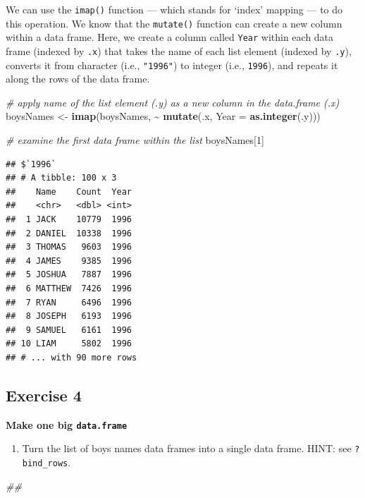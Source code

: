 \documentclass[
]{book}
\newenvironment{Shaded}{\begin{snugshade}}{\end{snugshade}}
\newcommand{\CommentTok}[1]{\textcolor[rgb]{0.56,0.35,0.01}{\textit{#1}}}
\newcommand{\DataTypeTok}[1]{\textcolor[rgb]{0.13,0.29,0.53}{#1}}
\newcommand{\DecValTok}[1]{\textcolor[rgb]{0.00,0.00,0.81}{#1}}
\newcommand{\KeywordTok}[1]{\textcolor[rgb]{0.13,0.29,0.53}{\textbf{#1}}}
\newcommand{\NormalTok}[1]{#1}
\newcommand{\OperatorTok}[1]{\textcolor[rgb]{0.81,0.36,0.00}{\textbf{#1}}}
\newcommand{\StringTok}[1]{\textcolor[rgb]{0.31,0.60,0.02}{#1}}
\providecommand{\tightlist}{%
  \setlength{\itemsep}{0pt}\setlength{\parskip}{0pt}}
\begin{document}
We can use the \texttt{imap()} function --- which stands for `index' mapping --- to do this operation. We know that the \texttt{mutate()} function can create a new column within a data frame. Here, we create a column called \texttt{Year} within each data frame (indexed by \texttt{.x}) that takes the name of each list element (indexed by \texttt{.y}), converts it from character (i.e., \texttt{"1996"}) to integer (i.e., \texttt{1996}), and repeats it along the rows of the data frame.

\begin{Shaded}
\begin{Highlighting}[]
\CommentTok{\# apply name of the list element (.y) as a new column in the data.frame (.x)}
\NormalTok{boysNames \textless{}{-}}\StringTok{ }\KeywordTok{imap}\NormalTok{(boysNames, }\OperatorTok{\textasciitilde{}}\StringTok{ }\KeywordTok{mutate}\NormalTok{(.x, }\DataTypeTok{Year =} \KeywordTok{as.integer}\NormalTok{(.y)))}

\CommentTok{\# examine the first data frame within the list}
\NormalTok{boysNames[}\DecValTok{1}\NormalTok{]}
\end{Highlighting}
\end{Shaded}

\begin{verbatim}
## $`1996`
## # A tibble: 100 x 3
##    Name    Count  Year
##    <chr>   <dbl> <int>
##  1 JACK    10779  1996
##  2 DANIEL  10338  1996
##  3 THOMAS   9603  1996
##  4 JAMES    9385  1996
##  5 JOSHUA   7887  1996
##  6 MATTHEW  7426  1996
##  7 RYAN     6496  1996
##  8 JOSEPH   6193  1996
##  9 SAMUEL   6161  1996
## 10 LIAM     5802  1996
## # ... with 90 more rows
\end{verbatim}

\hypertarget{exercise-4-1}{%
\subsection{Exercise 4}\label{exercise-4-1}}

\textbf{Make one big \texttt{data.frame}}

\begin{enumerate}
\def\labelenumi{\arabic{enumi}.}
\tightlist
\item
  Turn the list of boys names data frames into a single data frame. HINT: see \texttt{?bind\_rows}.
\end{enumerate}

\begin{Shaded}
\begin{Highlighting}[]
\CommentTok{\#\# }
\end{Highlighting}
\end{Shaded}
\end{document}

